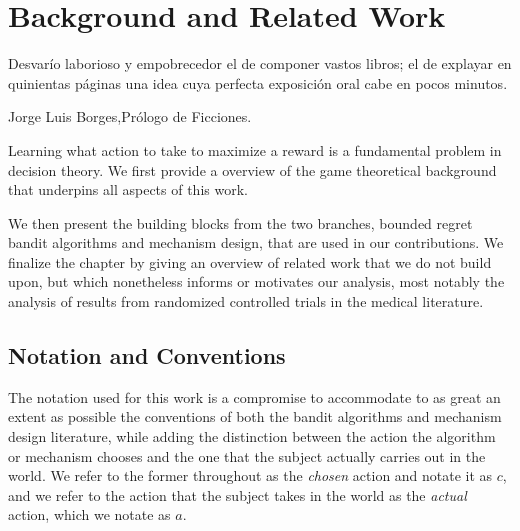 \chapter{Background and Related Work}
\label{cha:background}

\epigraph{Desvar\'io laborioso y empobrecedor el de componer vastos libros; el de explayar en quinientas p\'aginas una idea cuya perfecta exposici\'on oral cabe en pocos minutos.}{Jorge Luis Borges,Pr\'ologo de Ficciones.}





Learning what action to take to maximize a reward is a fundamental problem in decision theory.
We first provide a overview of the game theoretical background that underpins all aspects of this work.

We then present the building blocks from the two branches, bounded regret bandit algorithms and mechanism design, that are used in our contributions.
We finalize the chapter by giving an overview of related work that we do not build upon, but which nonetheless informs or motivates our analysis, most notably the analysis of results from randomized controlled trials in the medical literature. 

\section{Notation and Conventions}


The notation used for this work is a compromise to accommodate to as great an extent as possible the conventions of both the bandit algorithms and mechanism design literature, while adding the distinction between the action the algorithm or mechanism chooses and the one that the subject actually carries out in the world. We refer to the former throughout as the \emph{chosen} action and notate it as $c$, and we refer to the action that the subject takes in the world as the \emph{actual} action, which we notate as $a$.

